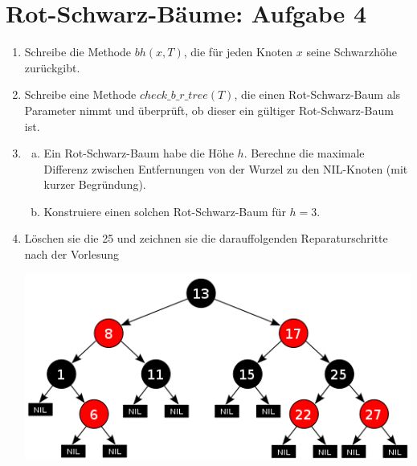 \documentclass{scrartcl}
\newcommand{\rbt}{Rot-Schwarz-Baum }
\begin{document}
\section*{Rot-Schwarz-Bäume: Aufgabe 4}
\begin{enumerate}[(1)]

\item Schreibe die Methode $bh(x,T)$, die f\"ur jeden Knoten $x$ seine Schwarzh\"ohe zur\"uckgibt.

\item Schreibe eine Methode $check\_b\_r\_tree(T)$, die einen \rbt als Parameter nimmt und \"uberpr\"uft, ob dieser ein g\"ultiger \rbt ist.

\item \begin{enumerate}[(a)]
\item Ein \rbt habe die H\"ohe $h$. Berechne die maximale Differenz zwischen Entfernungen von der Wurzel zu den NIL-Knoten (mit kurzer Begr\"undung).
\item Konstruiere einen solchen \rbt f\"ur $h=3$.
\end{enumerate}

\item L\"oschen sie die 25 und zeichnen sie die darauffolgenden Reparaturschritte nach der Vorlesung

{\center\includegraphics[scale=0.8]{images/redtree.png}}

\end{enumerate}
\end{document}
